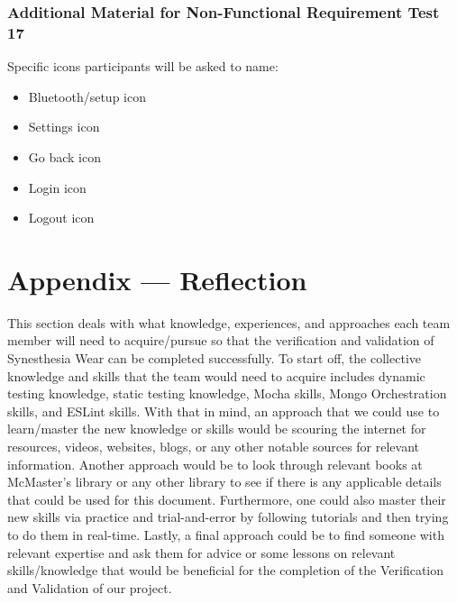 \documentclass[12pt, titlepage]{article}
\begin{document}
\subsubsection{Additional Material for Non-Functional Requirement Test 17}
\noindent Specific icons participants will be asked to name:
\begin{itemize}
  \item Bluetooth/setup icon
  \item Settings icon
  \item Go back icon
  \item Login icon
  \item Logout icon
\end{itemize}


\newpage{}
\section*{Appendix --- Reflection}
This section deals with what knowledge, experiences, and approaches each team member will need to acquire/pursue so that the verification and validation of Synesthesia Wear can be completed successfully.
To start off, the collective knowledge and skills that the team would need to acquire includes dynamic testing knowledge, static testing knowledge, Mocha skills, Mongo Orchestration skills, and ESLint skills.
With that in mind, an approach that we could use to learn/master the new knowledge or skills would be scouring the internet for resources, videos, websites, blogs, or any other notable sources for relevant information.
Another approach would be to look through relevant books at McMaster's library or any other library to see if there is any applicable details that could be used for this document.
Furthermore, one could also master their new skills via practice and trial-and-error by following tutorials and then trying to do them in real-time.
Lastly, a final approach could be to find someone with relevant expertise and ask them for advice or some lessons on relevant skills/knowledge that would be beneficial for the completion of the Verification and Validation of our project.
\end{document}
